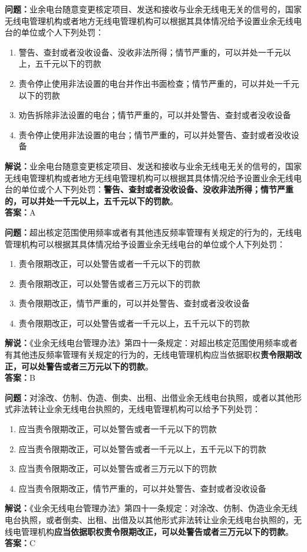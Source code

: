 \documentclass{ctexbook}
\begin{document}
\noindent\textbf{问题：}业余电台随意变更核定项目、发送和接收与业余无线电无关的信号的，国家无线电管理机构或者地方无线电管理机构可以根据其具体情况给予设置业余无线电台的单位或个人下列处罚：
\begin{enumerate}[label=\Alph*), leftmargin=3em]
	\item  警告、查封或者没收设备、没收非法所得；情节严重的，可以并处一千元以上，五千元以下的罚款
	\item  责令停止使用非法设置的电台并作出书面检查；情节严重的，可以并处一千元以下的罚款
	\item  劝告拆除非法设置的电台；情节严重的，可以并处警告、查封或者没收设备
	\item  责令停止使用非法设置的电台；情节严重的，可以并处警告、查封或者没收设备
\end{enumerate}
\noindent\textbf{解说：}业余电台随意变更核定项目、发送和接收与业余无线电无关的信号的，国家无线电管理机构或者地方无线电管理机构可以根据其具体情况给予设置业余无线电台的单位或个人下列处罚：\textbf{警告、查封或者没收设备、没收非法所得；情节严重的，可以并处一千元以上，五千元以下的罚款}。\\\noindent\textbf{答案：}A


\bigskip


\noindent\textbf{问题：}超出核定范围使用频率或者有其他违反频率管理有关规定的行为的，无线电管理机构可以根据其具体情况给予设置业余无线电台的单位或个人下列处罚：
\begin{enumerate}[label=\Alph*), leftmargin=3em]
	\item 责令限期改正，可以处警告或者一千元以下的罚款
	\item 责令限期改正，可以处警告或者三万元以下的罚款
	\item 责令限期改正，情节严重的，可以并处警告、查封或者没收设备
	\item 责令限期改正，可以处警告或者一千元以上，五千元以下的罚款
\end{enumerate}
\noindent\textbf{解说：}《业余无线电台管理办法》第四十一条规定：对超出核定范围使用频率或者有其他违反频率管理有关规定的行为的，无线电管理机构应当依据职权\textbf{责令限期改正，可以处警告或者三万元以下的罚款}。\\\textbf{答案：}B


\bigskip


\noindent\textbf{问题：}对涂改、仿制、伪造、倒卖、出租、出借业余无线电台执照，或者以其他形式非法转让业余无线电台执照的，无线电管理机构可以给予下列处罚：
\begin{enumerate}[label=\Alph*), leftmargin=3em] 
	\item 应当责令限期改正，可以处警告或者一千元以下的罚款
	\item 应当责令限期改正，可以处警告或者一千元以上，五千元以下的罚款
	\item 应当责令限期改正，可以处警告或者三万元以下的罚款
	\item 应当责令限期改正，情节严重的，可以并处警告、查封或者没收设备
\end{enumerate}
\noindent\textbf{解说：}《业余无线电台管理办法》第四十一条规定：对涂改、仿制、伪造业余无线电台执照，或者倒卖、出租、出借及以其他形式非法转让业余无线电台执照的，无线电管理机构\textbf{应当依据职权责令限期改正，可以处警告或者三万元以下的罚款}。\\\textbf{答案：}C
\end{document}
